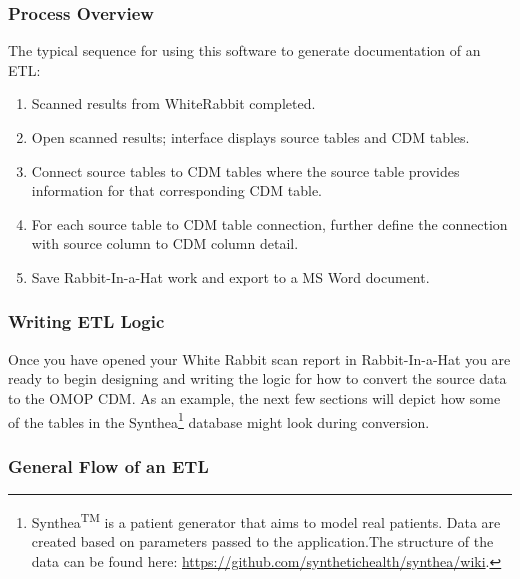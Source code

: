 \documentclass[11pt]{book}
\providecommand{\tightlist}{%
  \setlength{\itemsep}{0pt}\setlength{\parskip}{0pt}}
\let\rmarkdownfootnote\footnote%
\def\footnote{\protect\rmarkdownfootnote}
\theoremstyle{definition}
\theoremstyle{definition}
\theoremstyle{definition}
\theoremstyle{remark}
\begin{document}
\hypertarget{process-overview-1}{%
\subsubsection*{Process Overview}\label{process-overview-1}}

The typical sequence for using this software to generate documentation of an ETL:

\begin{enumerate}
\def\labelenumi{\arabic{enumi}.}
\tightlist
\item
  Scanned results from WhiteRabbit completed.
\item
  Open scanned results; interface displays source tables and CDM tables.
\item
  Connect source tables to CDM tables where the source table provides information for that corresponding CDM table.
\item
  For each source table to CDM table connection, further define the connection with source column to CDM column detail.
\item
  Save Rabbit-In-a-Hat work and export to a MS Word document.
\end{enumerate}

\hypertarget{writing-etl-logic}{%
\subsubsection*{Writing ETL Logic}\label{writing-etl-logic}}

Once you have opened your White Rabbit scan report in Rabbit-In-a-Hat you are ready to begin designing and writing the logic for how to convert the source data to the OMOP CDM. As an example, the next few sections will depict how some of the tables in the Synthea\footnote{Synthea\textsuperscript{TM} is a patient generator that aims to model real patients. Data are created based on parameters passed to the application.The structure of the data can be found here: \url{https://github.com/synthetichealth/synthea/wiki}.} database might look during conversion.

\hypertarget{general-flow-of-an-etl}{%
\subsubsection*{General Flow of an ETL}\label{general-flow-of-an-etl}}
\end{document}
